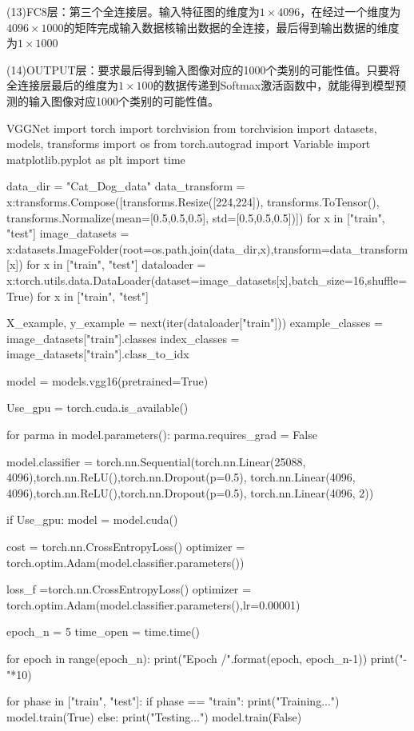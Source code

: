 \documentclass[openbib]{article}
\begin{document}
(13)FC8层：第三个全连接层。输入特征图的维度为$1\times4096$，在经过一个维度为$4096\times1000$的矩阵完成输入数据核输出数据的全连接，最后得到输出数据的维度为$1\times1000$

(14)OUTPUT层：要求最后得到输入图像对应的1000个类别的可能性值。只要将全连接层最后的维度为$1\times100$的数据传递到Softmax激活函数中，就能得到模型预测的输入图像对应1000个类别的可能性值。

\begin{Python}{VGGNet}
import torch
import torchvision
from torchvision import datasets, models, transforms
import os
from torch.autograd import Variable
import matplotlib.pyplot as plt
import time

data_dir = "Cat_Dog_data"
data_transform = {x:transforms.Compose([transforms.Resize([224,224]),
										transforms.ToTensor(),
										transforms.Normalize(mean=[0.5,0.5,0.5], std=[0.5,0.5,0.5])])
	for x in ["train", "test"]}
image_datasets = {x:datasets.ImageFolder(root=os.path.join(data_dir,x),transform=data_transform[x])
	for x in ["train", "test"]}
dataloader = {x:torch.utils.data.DataLoader(dataset=image_datasets[x],batch_size=16,shuffle=True)
	for x in ["train", "test"]}

X_example, y_example = next(iter(dataloader["train"]))
example_classes = image_datasets["train"].classes
index_classes = image_datasets["train"].class_to_idx

model = models.vgg16(pretrained=True)

Use_gpu = torch.cuda.is_available()

for parma in model.parameters():
	parma.requires_grad = False

model.classifier = torch.nn.Sequential(torch.nn.Linear(25088, 4096),torch.nn.ReLU(),torch.nn.Dropout(p=0.5),
										torch.nn.Linear(4096, 4096),torch.nn.ReLU(),torch.nn.Dropout(p=0.5),
										torch.nn.Linear(4096, 2))

if Use_gpu:
	model = model.cuda()

cost = torch.nn.CrossEntropyLoss()
optimizer = torch.optim.Adam(model.classifier.parameters())

loss_f =torch.nn.CrossEntropyLoss()
optimizer = torch.optim.Adam(model.classifier.parameters(),lr=0.00001)

epoch_n = 5
time_open = time.time()

for epoch in range(epoch_n):
	print("Epoch {}/{}".format(epoch, epoch_n-1))
	print("-"*10)

	for phase in ["train", "test"]:
	if phase == "train":
		print("Training...")
		model.train(True)
	else:
		print("Testing...")
		model.train(False)
	

\end{Python}
\end{document}
